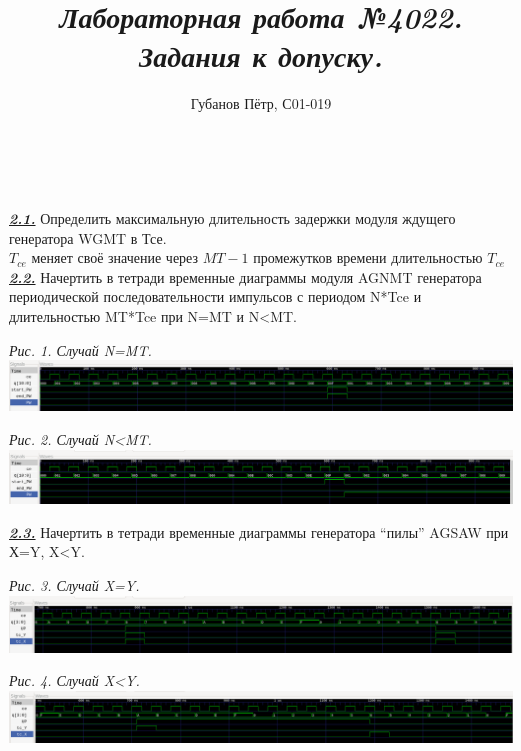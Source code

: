 \documentclass[a4paper]{article}
\begin{document}
\title{\textit{\textbf{Лабораторная работа №402}}}
\author{Губанов Пётр, С01-019}
\maketitle

\clearpage

\title{\large{\textit{2. Задания к допуску.}}}\\\\

\textbf{\textit{\underline{2.1.}}} Определить максимальную длительность задержки модуля ждущего генератора WGMT в Тсе. \\
$T_{ce}$ меняет своё значение через $MT-1$ промежутков времени длительностью $T_{ce}$ \\

\textbf{\textit{\underline{2.2.}}} Начертить в тетради временные диаграммы модуля AGNMT генератора периодической последовательности импульсов с периодом N*Tce и длительностью MT*Tce при N=MT и N<MT. \\
\begin{center}
	\textit{Рис. 1. Случай N=MT.}
	\includegraphics[scale=0.3]{../images/AGNMT_N=MT.png}
\end{center}

\begin{center}
	\textit{Рис. 2. Случай N<MT.}
	\includegraphics[scale=0.3]{../images/AGNMT_N<MT.png}
\end{center}

\textbf{\textit{\underline{2.3.}}} Начертить в тетради временные диаграммы генератора “пилы” AGSAW при Х=Y, X<Y.
\begin{center}
	\textit{Рис. 3. Случай X=Y.}
	\includegraphics[scale=0.3]{../images/AGSAW_YX_X=Y.png}
\end{center}
\begin{center}
	\textit{Рис. 4. Случай X<Y.}
	\includegraphics[scale=0.3]{../images/AGSAW_YX_X<Y.png}
\end{center}
\end{document}
